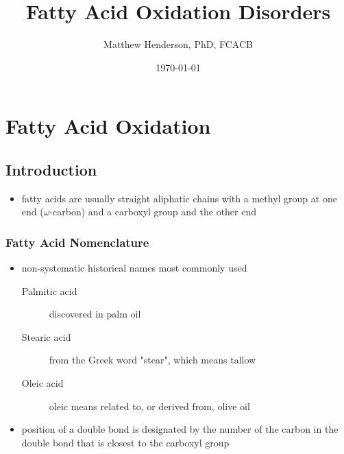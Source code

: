 \documentclass{scrartcl}
\author{Matthew Henderson, PhD, FCACB}
\date{\today}
\title{Fatty Acid Oxidation Disorders}
\begin{document}
\maketitle
\setcounter{tocdepth}{2}
\tableofcontents


\section{Fatty Acid Oxidation}
\label{sec:orgec1f713}
\subsection{Introduction}
\label{sec:org4b3ac5a}
\begin{itemize}
\item fatty acids are usually straight aliphatic chains with a methyl
group at one end (\(\omega\)-carbon) and a carboxyl group and the other
end
\end{itemize}


\subsubsection{Fatty Acid Nomenclature}
\label{sec:orgc275da9}
\begin{itemize}
\item non-systematic historical names most commonly used
\begin{description}
\item[{Palmitic acid}] discovered in palm oil
\item[{Stearic acid}] from the Greek word "stear", which means tallow
\item[{Oleic acid}] oleic means related to, or derived from, olive oil
\end{description}
\item position of a double bond is designated by the number of the carbon in the double bond that is closest to the carboxyl group
\end{itemize}
\end{document}
